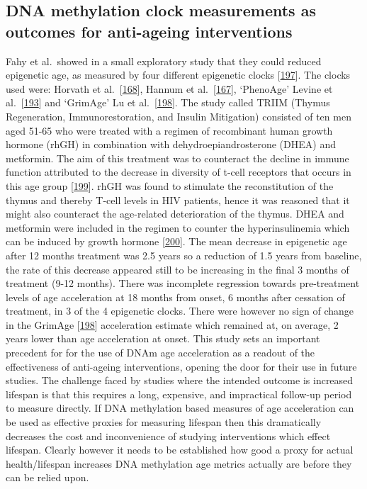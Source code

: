 \documentclass[
]{book}
\begin{document}
\hypertarget{dna-methylation-clock-measurements-as-outcomes-for-anti-ageing-interventions}{%
\subsection{DNA methylation clock measurements as outcomes for anti-ageing interventions}\label{dna-methylation-clock-measurements-as-outcomes-for-anti-ageing-interventions}}

Fahy et al.~showed in a small exploratory study that they could reduced epigenetic age, as measured by four different epigenetic clocks {[}\protect\hyperlink{ref-Fahy2019}{197}{]}.
The clocks used were: Horvath et al.~{[}\protect\hyperlink{ref-Horvath2013}{168}{]}, Hannum et al.~{[}\protect\hyperlink{ref-Hannum2013}{167}{]}, `PhenoAge' Levine et al.~{[}\protect\hyperlink{ref-Levine2018}{193}{]} and `GrimAge' Lu et al.~{[}\protect\hyperlink{ref-Lu2019a}{198}{]}.
The study called TRIIM (Thymus Regeneration, Immunorestoration, and Insulin Mitigation) consisted of ten men aged 51-65 who were treated with a regimen of recombinant human growth hormone (rhGH) in combination with dehydroepiandrosterone (DHEA) and metformin.
The aim of this treatment was to counteract the decline in immune function attributed to the decrease in diversity of t-cell receptors that occurs in this age group {[}\protect\hyperlink{ref-Naylor2005}{199}{]}.
rhGH was found to stimulate the reconstitution of the thymus and thereby T-cell levels in HIV patients, hence it was reasoned that it might also counteract the age-related deterioration of the thymus.
DHEA and metformin were included in the regimen to counter the hyperinsulinemia which can be induced by growth hormone {[}\protect\hyperlink{ref-Marcus1990}{200}{]}.
The mean decrease in epigenetic age after 12 months treatment was 2.5 years so a reduction of 1.5 years from baseline, the rate of this decrease appeared still to be increasing in the final 3 months of treatment (9-12 months).
There was incomplete regression towards pre-treatment levels of age acceleration at 18 months from onset, 6 months after cessation of treatment, in 3 of the 4 epigenetic clocks.
There were however no sign of change in the GrimAge {[}\protect\hyperlink{ref-Lu2019a}{198}{]} acceleration estimate which remained at, on average, 2 years lower than age acceleration at onset.
This study sets an important precedent for for the use of DNAm age acceleration as a readout of the effectiveness of anti-ageing interventions, opening the door for their use in future studies.
The challenge faced by studies where the intended outcome is increased lifespan is that this requires a long, expensive, and impractical follow-up period to measure directly.
If DNA methylation based measures of age acceleration can be used as effective proxies for measuring lifespan then this dramatically decreases the cost and inconvenience of studying interventions which effect lifespan.
Clearly however it needs to be established how good a proxy for actual health/lifespan increases DNA methylation age metrics actually are before they can be relied upon.
\end{document}
